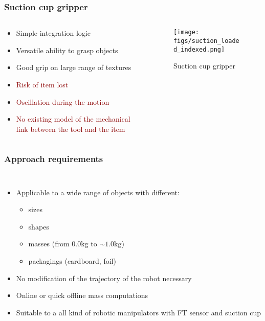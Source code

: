 \documentclass[aspectratio=1610]{beamer}
\begin{document}
\begin{frame}
\frametitle{Suction cup gripper}
\begin{columns}
\begin{column}{0.5\textwidth}
  \begin{itemize}\itemsep1em
    \justifying
    \item \textcolor{TextGreen}{Simple integration logic}
    \item \textcolor{TextGreen}{Versatile ability to grasp objects}
    \item \textcolor{TextGreen}{Good grip on large range of textures}
    \item \textcolor{darkred}{Risk of item lost}
    \item \textcolor{darkred}{Oscillation during the motion}
    \item \textcolor{darkred}{No existing model of the mechanical link between the tool and the item}
  \end{itemize}
\end{column}
\begin{column}{0.5\textwidth}  %
  \begin{figure}
    \centering
    \texttt{[image: figs/suction\_loaded\_indexed.png]}
    \caption{Suction cup gripper}
  \end{figure}
\end{column}
\end{columns}

\end{frame}

\begin{frame}
\frametitle{Approach requirements}
\begin{columns}
\column{37em}
\begin{itemize}\itemsep1em
  \justifying
  \item Applicable to a \textcolor{Ocean}{wide range of objects} with different:
  \begin{itemize}
    \item sizes
    \item shapes
    \item masses (from $0.0 \si{\kilogram}$ to $\sim 1.0 \si{\kilogram}$)
    \item packagings (cardboard, foil)
  \end{itemize}
  \item \textcolor{Ocean}{No modification} of the trajectory of the robot necessary
  \item \textcolor{Ocean}{Online} or \textcolor{Ocean}{quick offline} mass computations
  \item Suitable to a all kind of robotic manipulators with \textcolor{Ocean}{FT sensor} and \textcolor{Ocean}{suction cup}
\end{itemize}

\end{columns}
\end{frame}
\end{document}
